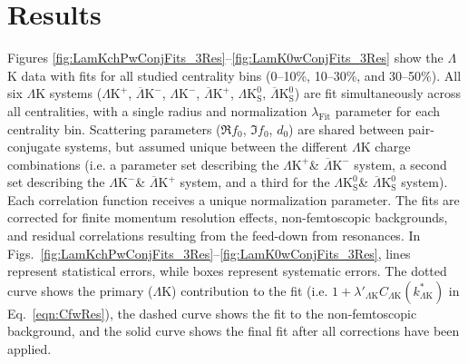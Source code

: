 \documentclass[ALICE,manyauthors]{cernphprep}
\newcommand{\LamK}{$\Lambda$K\xspace}
\newcommand{\LamKchP}{$\Lambda\mathrm{K^{+}}$\xspace}
\newcommand{\ALamKchM}{$\overline{\Lambda}\mathrm{K^{-}}$\xspace}
\newcommand{\LamKchM}{$\Lambda\mathrm{K^{-}}$\xspace}
\newcommand{\ALamKchP}{$\overline{\Lambda}\mathrm{K^{+}}$\xspace}
\newcommand{\LamKs}{$\Lambda\mathrm{K^{0}_{S}}$\xspace}
\newcommand{\ALamKs}{$\overline{\Lambda}\mathrm{K^{0}_{S}}$\xspace}
\begin{document}
\section{Results}
\label{sec:Results}

Figures \ref{fig:LamKchPwConjFits_3Res}--\ref{fig:LamK0wConjFits_3Res} show the \LamK data with fits for all studied centrality bins (0--10\%, 10--30\%, and 30--50\%). 
All six \LamK systems (\LamKchP, \ALamKchM, \LamKchM, \ALamKchP, \LamKs, \ALamKs) are fit simultaneously across all centralities, with a single radius and normalization $\lambda_{\mathrm{Fit}}$ parameter for each centrality bin.
Scattering parameters ($\Re f_{0}$, $\Im f_{0}$, $d_{0}$) are shared between pair-conjugate systems, but assumed unique between the different \LamK charge combinations (i.e. a parameter set describing the \LamKchP \& \ALamKchM system, a second set describing the \LamKchM \& \ALamKchP system, and a third for the \LamKs \& \ALamKs system).
Each correlation function receives a unique normalization parameter.
The fits are corrected for finite momentum resolution effects, non-femtoscopic backgrounds, and residual correlations resulting from the feed-down from resonances.
In Figs.\ \ref{fig:LamKchPwConjFits_3Res}--\ref{fig:LamK0wConjFits_3Res}, lines represent statistical errors, while boxes represent systematic errors.  
The dotted curve shows the primary (\LamK) contribution to the fit (i.e. $1 + \lambda'_{\Lambda\mathrm{K}}C_{\Lambda\mathrm{K}}(k^{*}_{\Lambda\mathrm{K}})$ in Eq.\ \ref{eqn:CfwRes}), the dashed curve shows the fit to the non-femtoscopic background, and the solid curve shows the final fit after all corrections have been applied.
\end{document}
